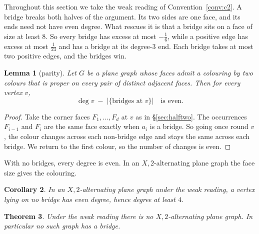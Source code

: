 \documentclass[11pt,a4paper]{amsart}
\theoremstyle{plain}
\newtheorem{theorem}{Theorem}[section]
\newtheorem{lemma}[theorem]{Lemma}
\newtheorem{corollary}[theorem]{Corollary}
\theoremstyle{definition}
\begin{document}
Throughout this section we take the weak reading of Convention~\ref{conv:c2}.
A bridge breaks both halves of the argument. Its two sides are one face, and its
ends need not have even degree. What rescues it is that a bridge sits on a face
of size at least $8$. So every bridge has excess at most $-\tfrac16$, while a
positive edge has excess at most $\tfrac1{24}$ and has a bridge at its
degree-$3$ end. Each bridge takes at most two positive edges, and the bridges
win.

\begin{lemma}[parity]\label{lem:parity}
Let $G$ be a plane graph whose faces admit a colouring by two colours that is
proper on every pair of distinct adjacent faces. Then for every vertex $v$,
\[
  \deg v \;-\; \bigl|\{\text{bridges at } v\}\bigr| \quad\text{is even.}
\]
\end{lemma}

\begin{proof}
Take the corner faces $F_1,\dots,F_d$ at $v$ as in \S\ref{sec:halftwo}. The
occurrences $F_{i-1}$ and $F_i$ are the same face exactly when $a_i$ is a
bridge. So going once round $v$, the colour changes across each non-bridge edge
and stays the same across each bridge. We return to the first colour, so the
number of changes is even.
\end{proof}

With no bridges, every degree is even. In an $X,2$-alternating plane graph the
face size gives the colouring.

\begin{corollary}\label{cor:evendeg}
In an $X,2$-alternating plane graph under the weak reading, a vertex lying on no
bridge has even degree, hence degree at least $4$.
\end{corollary}

\begin{theorem}\label{thm:nobridge}
Under the weak reading there is no $X,2$-alternating plane graph. In particular
no such graph has a bridge.
\end{theorem}
\end{document}
